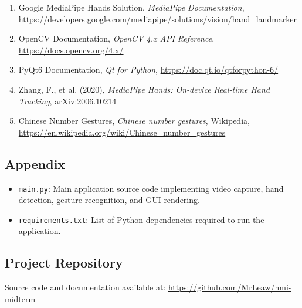 \documentclass{article}
\begin{document}
\begin{enumerate}
	\item Google MediaPipe Hands Solution, \textit{MediaPipe Documentation}, \url{https://developers.google.com/mediapipe/solutions/vision/hand\_landmarker}
	\item OpenCV Documentation, \textit{OpenCV 4.x API Reference}, \url{https://docs.opencv.org/4.x/}
	\item PyQt6 Documentation, \textit{Qt for Python}, \url{https://doc.qt.io/qtforpython-6/}
	\item Zhang, F., et al. (2020), \textit{MediaPipe Hands: On-device Real-time Hand Tracking}, arXiv:2006.10214
	\item Chinese Number Gestures, \textit{Chinese number gestures}, Wikipedia, \url{https://en.wikipedia.org/wiki/Chinese_number_gestures}
\end{enumerate}

\subsection*{Appendix}

\begin{itemize}
	\item \texttt{main.py}: Main application source code implementing video capture, hand detection, gesture recognition, and GUI rendering.
	\item \texttt{requirements.txt}: List of Python dependencies required to run the application.
\end{itemize}

\subsection*{Project Repository}

Source code and documentation available at: \url{https://github.com/MrLeaw/hmi-midterm}
\end{document}
